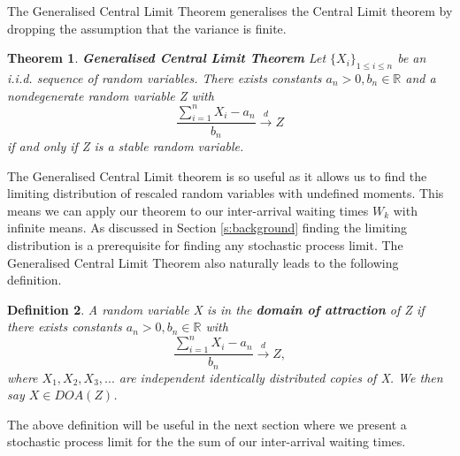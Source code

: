 \documentclass[honours,12pt]{UNSWthesis}
\newcommand{\R}{\mathbb{R}}
\newcommand{\1}{\mathbf 1}
\newtheorem{theorem}{Theorem}[section]
\newtheorem{definition}[theorem]{Definition}
\numberwithin{equation}{section}
\theoremstyle{definition}
\theoremstyle{remark}
\begin{document}
\noindent The Generalised Central Limit Theorem generalises the Central Limit theorem by dropping the assumption that the variance is finite.\\

\begin{theorem}
\textbf{Generalised Central Limit Theorem} Let $\{X_i\}_{1\leq i \leq n}$ be an i.i.d. sequence of random variables. There exists constants $a_n>0, b_n \in \R$ and a nondegenerate random variable Z with 
\[
	\frac{\sum^n_{i=1}X_i-a_n}{b_n} \overset{d}{\longrightarrow}Z
\]
if and only if Z is a stable random variable.\\
\end{theorem}

\noindent The Generalised Central Limit theorem is so useful as it allows us to find the limiting distribution of rescaled random variables with undefined moments. This means we can apply our theorem to our inter-arrival waiting times $W_k$ with infinite means. As discussed in Section \ref{s:background} finding the limiting distribution is a prerequisite for finding any stochastic process limit. The Generalised Central Limit Theorem also naturally leads to the following definition.\\

\begin{definition}\cite{Nolan2015}
	A random variable X is in the \textbf{domain of attraction} of Z if there exists constants $a_n>0,b_n\in\R$ with
	\[
		\frac{\sum^n_{i=1}X_i-a_n}{b_n} \overset{d}{\longrightarrow}Z,
	\]
	where $X_1,X_2,X_3,...$ are independent identically distributed copies of X. We then say $X\in DOA(Z)$.\\
\end{definition}

\noindent The above definition will be useful in the next section where we present a stochastic process limit for the the sum of our inter-arrival waiting times.\\
\end{document}
